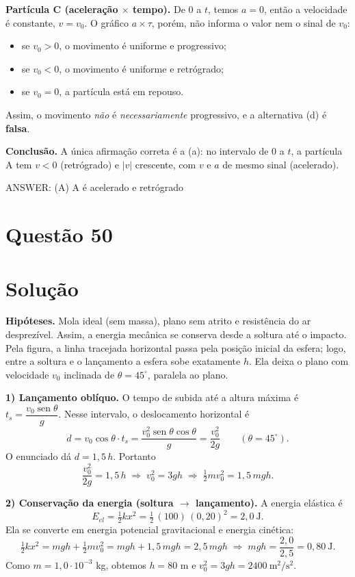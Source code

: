\documentclass{article}%
\begin{document}
\textbf{Partícula C (aceleração $\times$ tempo).} De $0$ a $t$, temos $a=0$, então a velocidade é constante, $v=v_0$. O gráfico $a\times\tau$, porém, não informa o valor nem o sinal de $v_0$:
\begin{itemize}
\item se $v_0>0$, o movimento é uniforme e progressivo;
\item se $v_0<0$, o movimento é uniforme e retrógrado;
\item se $v_0=0$, a partícula está em repouso.
\end{itemize}
Assim, o movimento \emph{não} é \emph{necessariamente} progressivo, e a alternativa (d) é \textbf{falsa}.

\textbf{Conclusão.} A única afirmação correta é a (a): no intervalo de $0$ a $t$, a partícula A tem $v<0$ (retrógrado) e $|v|$ crescente, com $v$ e $a$ de mesmo sinal (acelerado).

ANSWER: (A) A é acelerado e retrógrado%
\newpage%
\section*{Questão 50}

\section*{Solução}

\textbf{Hipóteses.} Mola ideal (sem massa), plano sem atrito e resistência do ar desprezível. Assim, a energia mecânica se conserva desde a soltura até o impacto. Pela figura, a linha tracejada horizontal passa pela posição inicial da esfera; logo, entre a soltura e o lançamento a esfera sobe exatamente $h$. Ela deixa o plano com velocidade $v_0$ inclinada de $\theta = 45^\circ$, paralela ao plano.

\textbf{1) Lançamento oblíquo.} O tempo de subida até a altura máxima é $t_s = \dfrac{v_0 \operatorname{sen}\theta}{g}$. Nesse intervalo, o deslocamento horizontal é
\[
d = v_0\cos\theta \cdot t_s = \frac{v_0^2 \operatorname{sen}\theta\cos\theta}{g} = \frac{v_0^2}{2g}\qquad(\theta = 45^\circ).
\]
O enunciado dá $d = 1{,}5\,h$. Portanto
\[
\frac{v_0^2}{2g} = 1{,}5\,h \;\Longrightarrow\; v_0^2 = 3gh \;\Longrightarrow\; \tfrac12 m v_0^2 = 1{,}5\,mgh .
\]

\textbf{2) Conservação da energia (soltura $\to$ lançamento).} A energia elástica é
\[
E_{el} = \tfrac12 k x^2 = \tfrac12\,(100)\,(0{,}20)^2 = 2{,}0\ \text{J}.
\]
Ela se converte em energia potencial gravitacional e energia cinética:
\[
\tfrac12 k x^2 = mgh + \tfrac12 m v_0^2 = mgh + 1{,}5\,mgh = 2{,}5\,mgh
\;\Longrightarrow\; mgh = \frac{2{,}0}{2{,}5} = 0{,}80\ \text{J}.
\]
Como $m = 1{,}0\cdot 10^{-3}$ kg, obtemos $h = 80$ m e $v_0^2 = 3gh = 2400\ \text{m}^2/\text{s}^2$.
\end{document}
